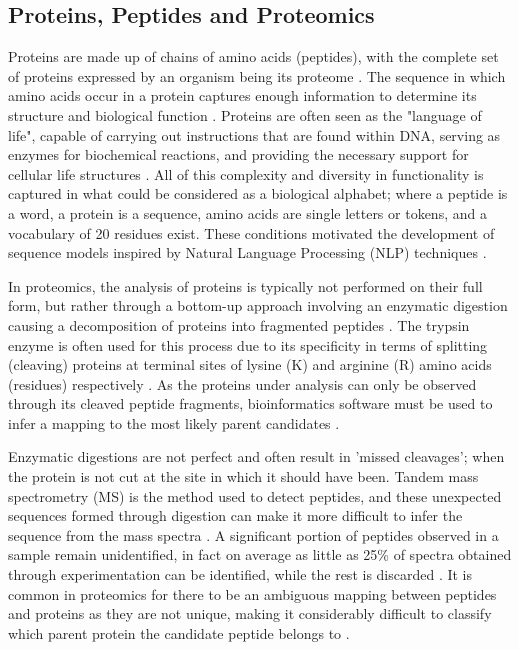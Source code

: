 \documentclass[journal]{IEEEtran}
\begin{document}
\subsection{Proteins, Peptides and Proteomics}
Proteins are made up of chains of amino acids (peptides), with the complete set of proteins
expressed by an organism being its proteome \cite{https://doi.org/10.1002/imt2.70031}. The sequence
in which amino acids occur in a protein captures enough information to determine its structure and biological function
\cite{Dinh2026}. Proteins are often seen as the "language of life", capable of 
carrying out instructions that are found within DNA, serving as enzymes for biochemical
reactions, and providing the necessary support for cellular life structures \cite{https://doi.org/10.1002/imt2.70031}.
All of this complexity and diversity in functionality is captured in what could be considered as a biological alphabet; where a peptide is a word, 
a protein is a sequence, amino acids are single letters or tokens, and a vocabulary of 20 residues exist. These conditions motivated
the development of sequence models inspired by Natural Language Processing (NLP) techniques \cite{Dinh2026}.

In proteomics, the analysis of proteins is typically not performed on their full form, but rather through a bottom-up
approach involving an enzymatic digestion causing a decomposition of proteins into fragmented peptides \cite{https://doi.org/10.1002/imt2.70031}.
The trypsin enzyme is often used for this process due to its specificity in terms of splitting (cleaving)
proteins at terminal sites of lysine (K) and arginine (R) amino acids (residues) respectively \cite{https://doi.org/10.1002/imt2.70031}.
As the proteins under analysis can only be observed through its
cleaved peptide fragments, bioinformatics software must be used to infer a mapping to the most likely
parent candidates \cite{https://doi.org/10.1002/imt2.70031}.

Enzymatic digestions are not perfect and often result in 'missed cleavages'; when the protein
is not cut at the site in which it should have been. Tandem mass spectrometry (MS) is the method used to detect peptides,
and these unexpected sequences formed through digestion can make
it more difficult to infer the sequence from the mass spectra \cite{MCDONNELL20232732}. A significant portion of peptides observed in
a sample remain unidentified, in fact on average as little as 25\% of spectra obtained through
experimentation can be identified, while the rest is discarded \cite{MCDONNELL20232732}. It is
common in proteomics for there to be an ambiguous mapping between peptides and proteins as they
are not unique, making it considerably difficult to classify which parent protein the candidate peptide
belongs to \cite{MCDONNELL20232732}. 
\end{document}
